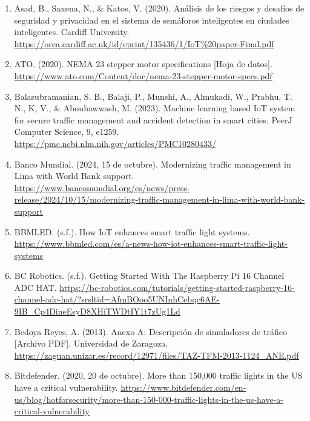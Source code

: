 \documentclass[12pt,a4paper,oneside]{report}
\providecommand{\ul}[1]{\underline{#1}}
\begin{document}
\begin{enumerate}
\item
  Asad, B., Saxena, N., \& Katos, V. (2020). Análisis de los riesgos y desafíos de seguridad y privacidad en el sistema de semáforos inteligentes en ciudades inteligentes. Cardiff University. \href{https://orca.cardiff.ac.uk/id/eprint/135436/1/IoT\%20paper-Final.pdf}{\ul{https://orca.cardiff.ac.uk/id/eprint/135436/1/IoT\%20paper-Final.pdf}}
\item
  ATO. (2020). NEMA 23 stepper motor specifications {[}Hoja de datos{]}. \href{https://www.ato.com/Content/doc/nema-23-stepper-motor-specs.pdf}{\ul{https://www.ato.com/Content/doc/nema-23-stepper-motor-specs.pdf}}
\item
  Balasubramanian, S. B., Balaji, P., Munshi, A., Almukadi, W., Prabhu, T. N., K, V., \& Abouhawwash, M. (2023). Machine learning based IoT system for secure traffic management and accident detection in smart cities. PeerJ Computer Science, 9, e1259. \href{https://pmc.ncbi.nlm.nih.gov/articles/PMC10280433/}{\ul{https://pmc.ncbi.nlm.nih.gov/articles/PMC10280433/}}
\item
  Banco Mundial. (2024, 15 de octubre). Modernizing traffic management in Lima with World Bank support. \href{https://www.bancomundial.org/es/news/press-release/2024/10/15/modernizing-traffic-management-in-lima-with-world-bank-support}{\ul{https://www.bancomundial.org/es/news/press-release/2024/10/15/modernizing-traffic-management-in-lima-with-world-bank-support}}
\item
  BBMLED. (s.f.). How IoT enhances smart traffic light systems. \href{https://www.bbmled.com/es/a-news-how-iot-enhances-smart-traffic-light-systems}{\ul{https://www.bbmled.com/es/a-news-how-iot-enhances-smart-traffic-light-systems}}
\item
  BC Robotics. (s.f.). Getting Started With The Raspberry Pi 16 Channel ADC HAT. \href{https://bc-robotics.com/tutorials/getting-started-raspberry-16-channel-adc-hat/?srsltid=AfmBOoo5UNInhCebqc6AE-9IB_Cp4DineEsyD8XHiTWDtIY1t7zUg1Ld}{\ul{https://bc-robotics.com/tutorials/getting-started-raspberry-16-channel-adc-hat/?srsltid=AfmBOoo5UNInhCebqc6AE-9IB\_Cp4DineEsyD8XHiTWDtIY1t7zUg1Ld}}
\item
  Bedoya Reyes, A. (2013). Anexo A: Descripción de simuladores de tráfico {[}Archivo PDF{]}. Universidad de Zaragoza. \href{https://zaguan.unizar.es/record/12971/files/TAZ-TFM-2013-1124_ANE.pdf}{\ul{https://zaguan.unizar.es/record/12971/files/TAZ-TFM-2013-1124\_ANE.pdf}}
\item
  Bitdefender. (2020, 20 de octubre). More than 150,000 traffic lights in the US have a critical vulnerability. \href{https://www.bitdefender.com/en-us/blog/hotforsecurity/more-than-150-000-traffic-lights-in-the-us-have-a-critical-vulnerability}{\ul{https://www.bitdefender.com/en-us/blog/hotforsecurity/more-than-150-000-traffic-lights-in-the-us-have-a-critical-vulnerability}}

\end{enumerate}
\end{document}
